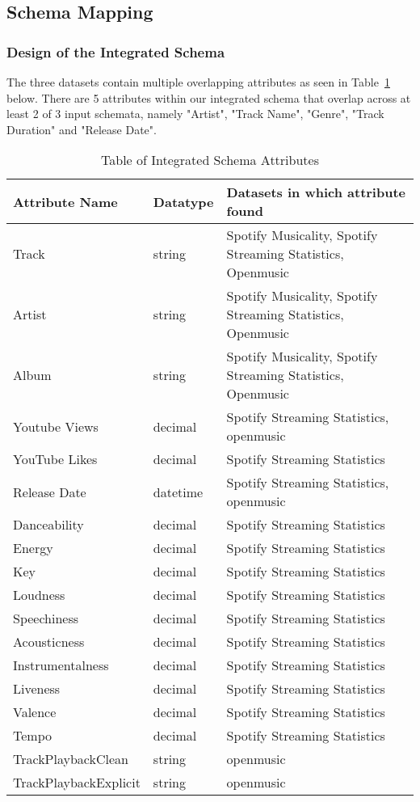 \documentclass[runningheads]{llncs}
\begin{document}
\subsection{Schema Mapping}
\subsubsection{Design of the Integrated Schema}
The three datasets contain multiple overlapping attributes as seen in Table~\ref{tab2} below. There are 5 attributes within our integrated schema that overlap across at least 2 of 3 input schemata, namely "Artist", "Track Name", "Genre", "Track Duration" and "Release Date".

\begin{table}[h]
	\renewcommand{\arraystretch}{1.5}
	\caption{Table of Integrated Schema Attributes}\label{tab2}
	\centering
	\begin{tabular}{p{4cm}p{3cm}p{6cm}}
		\toprule
		\textbf{Attribute Name} &  \textbf{ Datatype}&\textbf{Datasets in which  attribute found}\\
		\hline
		\hline
		Track&string&Spotify  Musicality, Spotify  Streaming  Statistics, Openmusic\\
		Artist&string&Spotify  Musicality, Spotify  Streaming  Statistics, Openmusic\\
		Album&string&Spotify  Musicality, Spotify  Streaming  Statistics, Openmusic\\
		Youtube Views&decimal&Spotify  Streaming  Statistics, openmusic\\
		YouTube Likes&decimal&Spotify  Streaming  Statistics\\
		Release Date&datetime&Spotify  Streaming  Statistics, openmusic\\
		Danceability&decimal&Spotify  Streaming  Statistics\\
		Energy&decimal&Spotify  Streaming  Statistics\\
		Key&decimal&Spotify  Streaming  Statistics\\
		Loudness&decimal&Spotify  Streaming  Statistics\\
		Speechiness&decimal&Spotify  Streaming  Statistics\\
		Acousticness&decimal&Spotify  Streaming  Statistics\\
		Instrumentalness&decimal&Spotify  Streaming  Statistics\\
		Liveness&decimal&Spotify  Streaming  Statistics\\
		Valence&decimal&Spotify  Streaming  Statistics\\
		Tempo&decimal&Spotify  Streaming  Statistics\\
		TrackPlaybackClean&string&openmusic\\
		TrackPlaybackExplicit&string&openmusic\\
		\hline
		\hline
	\end{tabular}
\end{table}
\end{document}
